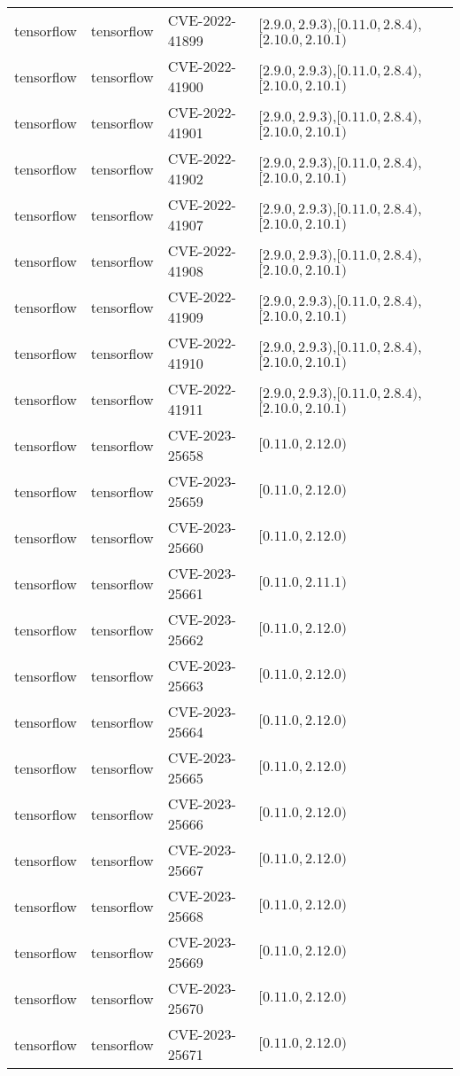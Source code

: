 \begin{tabular}{llll}
tensorflow & tensorflow & CVE-2022-41899 & $[2.9.0,2.9.3)$,$[0.11.0,2.8.4)$,$[2.10.0,2.10.1)$ \\
tensorflow & tensorflow & CVE-2022-41900 & $[2.9.0,2.9.3)$,$[0.11.0,2.8.4)$,$[2.10.0,2.10.1)$ \\
tensorflow & tensorflow & CVE-2022-41901 & $[2.9.0,2.9.3)$,$[0.11.0,2.8.4)$,$[2.10.0,2.10.1)$ \\
tensorflow & tensorflow & CVE-2022-41902 & $[2.9.0,2.9.3)$,$[0.11.0,2.8.4)$,$[2.10.0,2.10.1)$ \\
tensorflow & tensorflow & CVE-2022-41907 & $[2.9.0,2.9.3)$,$[0.11.0,2.8.4)$,$[2.10.0,2.10.1)$ \\
tensorflow & tensorflow & CVE-2022-41908 & $[2.9.0,2.9.3)$,$[0.11.0,2.8.4)$,$[2.10.0,2.10.1)$ \\
tensorflow & tensorflow & CVE-2022-41909 & $[2.9.0,2.9.3)$,$[0.11.0,2.8.4)$,$[2.10.0,2.10.1)$ \\
tensorflow & tensorflow & CVE-2022-41910 & $[2.9.0,2.9.3)$,$[0.11.0,2.8.4)$,$[2.10.0,2.10.1)$ \\
tensorflow & tensorflow & CVE-2022-41911 & $[2.9.0,2.9.3)$,$[0.11.0,2.8.4)$,$[2.10.0,2.10.1)$ \\
tensorflow & tensorflow & CVE-2023-25658 & $[0.11.0,2.12.0)$ \\
tensorflow & tensorflow & CVE-2023-25659 & $[0.11.0,2.12.0)$ \\
tensorflow & tensorflow & CVE-2023-25660 & $[0.11.0,2.12.0)$ \\
tensorflow & tensorflow & CVE-2023-25661 & $[0.11.0,2.11.1)$ \\
tensorflow & tensorflow & CVE-2023-25662 & $[0.11.0,2.12.0)$ \\
tensorflow & tensorflow & CVE-2023-25663 & $[0.11.0,2.12.0)$ \\
tensorflow & tensorflow & CVE-2023-25664 & $[0.11.0,2.12.0)$ \\
tensorflow & tensorflow & CVE-2023-25665 & $[0.11.0,2.12.0)$ \\
tensorflow & tensorflow & CVE-2023-25666 & $[0.11.0,2.12.0)$ \\
tensorflow & tensorflow & CVE-2023-25667 & $[0.11.0,2.12.0)$ \\
tensorflow & tensorflow & CVE-2023-25668 & $[0.11.0,2.12.0)$ \\
tensorflow & tensorflow & CVE-2023-25669 & $[0.11.0,2.12.0)$ \\
tensorflow & tensorflow & CVE-2023-25670 & $[0.11.0,2.12.0)$ \\
tensorflow & tensorflow & CVE-2023-25671 & $[0.11.0,2.12.0)$ \\

\end{tabular}
